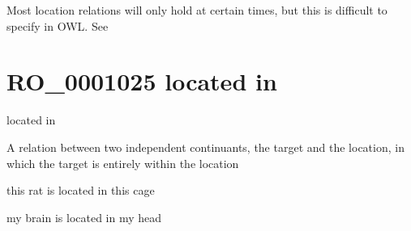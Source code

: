 \documentclass[letterpaper,10pt,english]{sphinxmanual}
\begin{document}
\begin{sphinxShadowBox}

\sphinxAtStartPar
Most location relations will only hold at certain times, but this is difficult to specify in OWL. See 
\end{sphinxShadowBox}

\begin{sphinxShadowBox}

\sphinxAtStartPar
{}
\end{sphinxShadowBox}
\begin{quote}
\label{\detokenize{doc-RO_0001025:ro-0001025}}\label{\detokenize{doc-RO_0001025:located-in}}\label{\detokenize{doc-RO_0001025:ro-0001025}}
\ignorespaces \end{quote}


\section{RO\_0001025 \sphinxhyphen{} located in}
\label{\detokenize{doc-RO_0001025:ro-0001025-located-in}}\label{\detokenize{doc-RO_0001025:index-0}}\label{\detokenize{doc-RO_0001025::doc}}
\begin{sphinxShadowBox}

\sphinxAtStartPar
located in
\end{sphinxShadowBox}

\begin{sphinxShadowBox}

\sphinxAtStartPar
A relation between two independent continuants, the target and the location, in which the target is entirely within the location
\end{sphinxShadowBox}

\begin{sphinxShadowBox}

\sphinxAtStartPar
this rat is located in this cage

\sphinxAtStartPar
my brain is located in my head
\end{sphinxShadowBox}
\end{document}

